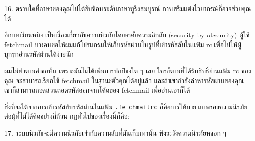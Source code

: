 \begin{fancyquotes}
  16. ตราบใดที่ภาษาของคุณไม่ได้ซับซ้อนระดับภาษาทูริงสมบูรณ์
  การเสริมแต่งไวยากรณ์ก็อาจช่วยคุณได้
\end{fancyquotes}

อีกบทเรียนหนึ่ง เป็นเรื่องเกี่ยวกับความนิรภัยโดยอาศัยความลึกลับ
(security by obscurity) ผู้ใช้ fetchmail
บางคนขอให้ผมแก้โปรแกรมให้เก็บรหัสผ่านในรูปที่เข้ารหัสลับในแฟ้ม rc
เพื่อไม่ให้ผู้บุกรุกอ่านรหัสผ่านได้ง่ายนัก

ผมไม่ทำตามคำขอนั้น เพราะมันไม่ได้เพิ่มการปกป้องใด ๆ  เลย
ใครก็ตามที่ได้รับสิทธิ์อ่านแฟ้ม rc ของคุณ จะสามารถเรียกใช้ fetchmail
ในฐานะตัวคุณได้อยู่แล้ว และถ้าเขากำลังล่าหารหัสผ่านของคุณ
เขาก็สามารถถอดส่วนถอดรหัสออกจากโค้ดของ fetchmail เพื่ออ่านเอาก็ได้

สิ่งที่จะได้จากการเข้ารหัสลับรหัสผ่านในแฟ้ม \texttt{.fetchmailrc}
ก็คือการให้มายาภาพของความนิรภัยต่อผู้ที่ไม่ได้คิดอย่างถี่ถ้วน
กฎทั่วไปของเรื่องนี้ก็คือ:

\begin{fancyquotes}
  17. ระบบนิรภัยจะมีความนิรภัยเท่ากับความลับที่มันเก็บเท่านั้น
  พึงระวังความนิรภัยหลอก ๆ
\end{fancyquotes}